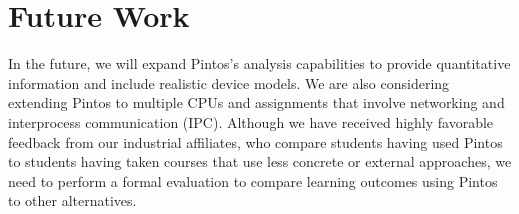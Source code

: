 \section{Future Work}

In the future, we will expand Pintos's analysis capabilities to
provide quantitative information and include realistic device models.
We are also considering extending Pintos to multiple
CPUs and assignments that involve
networking and interprocess communication (IPC).
Although we have received highly favorable feedback from our 
industrial affiliates, who compare students having used Pintos 
to students having taken courses that use less concrete or external approaches,
we need to perform a formal evaluation to compare learning
outcomes using Pintos to other alternatives.
